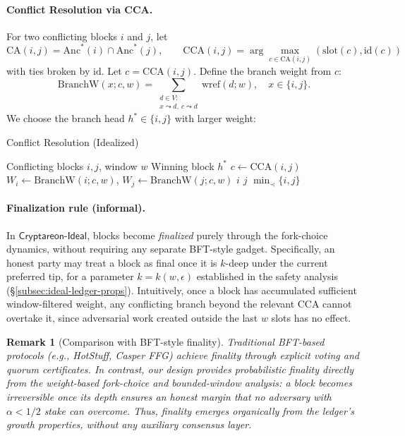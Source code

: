 \documentclass[11pt]{article}
\newtheorem{remark}[theorem]{Remark}
\newcommand{\ProjIdeal}{\ensuremath{\mathsf{Cryptareon\text{-}Ideal}}\xspace}
\newcommand{\id}{\ensuremath{\mathrm{id}}\xspace}
\newcommand{\slot}{\ensuremath{\mathrm{slot}}\xspace}
\newcommand{\Anc}{\ensuremath{\mathrm{Anc}}\xspace}
\newcommand{\wref}{\ensuremath{\mathrm{wref}}\xspace}
\newcommand{\BranchW}{\ensuremath{\mathrm{BranchW}}\xspace}
\newcommand{\CA}{\ensuremath{\mathrm{CA}}\xspace}
\newcommand{\CCA}{\ensuremath{\mathrm{CCA}}\xspace}
\begin{document}
\paragraph{Conflict Resolution via CCA.} For two conflicting blocks $i$ and $j$, let
\begin{equation*}
\CA(i,j)=\Anc^*(i)\cap \Anc^*(j),\qquad
\CCA(i,j)=\arg\max_{c\in \CA(i,j)}(\slot(c),\id(c))
\end{equation*}
with ties broken by $\id$. Let $c=\CCA(i,j)$. Define the branch weight from $c$:
\begin{equation*}
\BranchW(x; c, w) = \sum_{\substack{d\in V:\\ x\leadsto d,\ c\leadsto d}} \wref(d;w),\quad x\in\{i,j\}.
\end{equation*}
We choose the branch head $h^*\in\{i,j\}$ with larger weight:

\begin{algorithm}[H]
\caption{Conflict Resolution (Idealized)}
\label{alg:ideal-cca}
\begin{algorithmic}[1]
\Require Conflicting blocks $i,j$, window $w$
\Ensure Winning block $h^*$
\State $c \gets \CCA(i,j)$
\State $W_i\gets\BranchW(i;c,w)$, \quad $W_j\gets\BranchW(j;c,w)$
 \Return $i$
 \Return $j$
\Else \Return $\min\nolimits_{\prec}\{i,j\}$ 
\EndIf
\end{algorithmic}
\end{algorithm}



\paragraph{Finalization rule (informal).}
In \ProjIdeal, blocks become \emph{finalized} purely through the fork-choice dynamics,
without requiring any separate BFT-style gadget.
Specifically, an honest party may treat a block as final once it is
$k$-deep under the current preferred tip, for a parameter
$k=k(w,\epsilon)$ established in the safety analysis
(\S\ref{subsec:ideal-ledger-props}).
Intuitively, once a block has accumulated sufficient window-filtered weight,
any conflicting branch beyond the relevant CCA cannot overtake it,
since adversarial work created outside the last $w$ slots has no effect.

\begin{remark}[Comparison with BFT-style finality]
Traditional BFT-based protocols (e.g., HotStuff, Casper FFG) achieve finality
through explicit voting and quorum certificates.
In contrast, our design provides \emph{probabilistic finality} directly from
the weight-based fork-choice and bounded-window analysis:
a block becomes irreversible once its depth ensures an honest margin
that no adversary with $\alpha < 1/2$ stake can overcome.
Thus, finality emerges organically from the ledger’s growth properties,
without any auxiliary consensus layer.
\end{remark}
\end{document}
